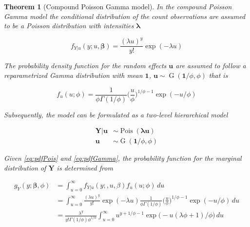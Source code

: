 \documentclass[a4paper,twoside,11pt]{report} %
\DeclareMathOperator{\G}{G}
\DeclareMathOperator{\Pois}{Pois}
\newtheorem{theorem}{Theorem}[chapter]
\theoremstyle{definition}
\theoremstyle{definition}
\theoremstyle{definition}
\theoremstyle{definition}
\theoremstyle{remark}
\begin{document}
\begin{theorem}[Compound Poisson Gamma model]
\protect\hypertarget{thm:poisgTheorem}{}\label{thm:poisgTheorem}In the compound Poisson Gamma model the conditional distribution of the count observations are assumed to be a Poisson distribution with intensities \(\boldsymbol \lambda\)

\begin{equation}\label{eq:pdfPois}
  f_{Y|u}(y;u,\boldsymbol{\beta})=\frac{(\lambda u)^{y}}{y!}\exp(-\lambda u)
\end{equation}

The probability density function for the random effects \(\boldsymbol u\) are assumed to follow a reparametrized Gamma distribution with mean \(\boldsymbol 1\), \(\boldsymbol u \sim \G(\boldsymbol 1/\phi,\phi)\) that is

\begin{equation} \label{eq:pdfGamma}
  f_{u}(u;\phi)=\frac{1}{\phi \Gamma(1/\phi)} \bigg(\frac{u}{\phi}\bigg)^{1/\phi-1} \exp (-u/\phi)
\end{equation}

Subsequently, the model can be formulated as a two-level hierarchical model

\begin{subequations} \label{eq:PoisGam}
  \begin{alignat}{2}
    \boldsymbol{Y|u} &\sim \Pois (\boldsymbol{\lambda u}) \label{eq:pois_g0} \\ 
    \boldsymbol{u} &\sim \G(\boldsymbol 1/\phi,\phi) \label{eq:pois_g1}
  \end{alignat}
\end{subequations}

Given \eqref{eq:pdfPois} and \eqref{eq:pdfGamma}, the probability function for the marginal distribution of \(\boldsymbol Y\) is determined from

\begin{equation} \label{eq:marMix}
  \begin{aligned}
    g_{Y}(y;\boldsymbol \beta,\phi)&=\int_{u=0}^\infty f_{Y|u}(y;\boldsymbol, u, \beta) f_{u}(u;\phi) \,du \\
    &=\int_{u=0}^\infty \frac{(\lambda u)^y}{y!} \exp (-\lambda u) \frac{1}{\phi \Gamma(1/\phi)} \bigg(\frac{u}{\phi}\bigg)^{1/\phi-1} \exp (-u /\phi) \,du\\
    &=\frac{\lambda^{y}}{y!\Gamma(1/\phi)\phi^{1/\phi}} \int_{u=0}^\infty u^{y+1/\phi-1} \exp \big(-u(\lambda \phi+1)/\phi\big) \,du
  \end{aligned}
\end{equation}


\end{theorem}
\end{document}
